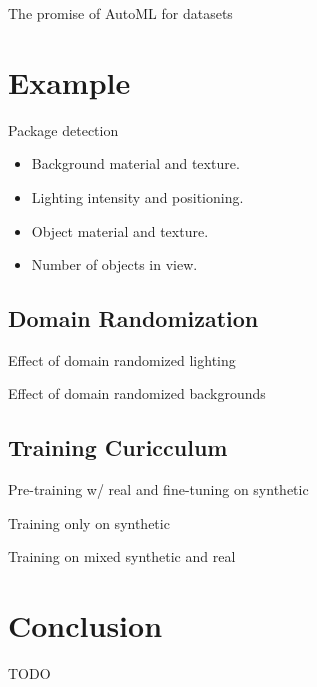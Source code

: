 \documentclass{article}
\begin{document}
The promise of AutoML for datasets


\section{Example}
\label{sec:example}

Package detection

\begin{itemize}
	\item Background material and texture.
	\item Lighting intensity and positioning.
	\item Object material and texture.
	\item Number of objects in view.
\end{itemize}

\subsection{Domain Randomization}
\label{sec:domainrandomization}

Effect of domain randomized lighting

Effect of domain randomized backgrounds

\subsection{Training Curicculum}
\label{sec:curicculum}

Pre-training w/ real and fine-tuning on synthetic

Training only on synthetic

Training on mixed synthetic and real

\section{Conclusion}
\label{sec:conclusion}

TODO



\end{document}
